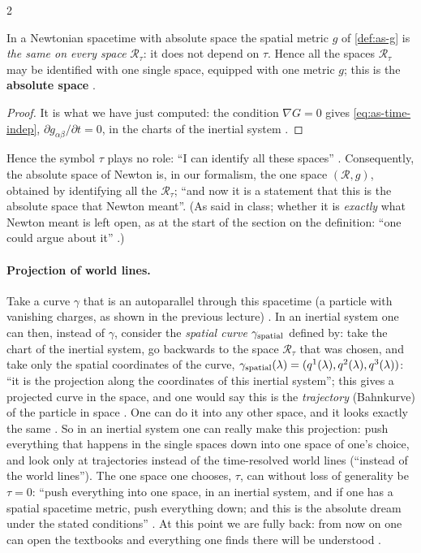 \begin{paracol}{2}
\begin{theorem}\label{thm:as-absolute}
In a Newtonian spacetime with absolute space the spatial metric $g$ of \cref{def:as-g} is \emph{the same on every space} $\mathcal R_\tau$: it does not depend on $\tau$. Hence all the spaces $\mathcal R_\tau$ may be identified with one single space, equipped with one metric $g$; this is the
\textbf{absolute space} .
\end{theorem}
\begin{proof}
It is what we have just computed: the condition $\nabla G=0$ gives \eqref{eq:as-time-indep}, $\partial g_{\alpha\beta}/\partial t=0$, in the charts of the inertial system . \qedhere
\end{proof}
Hence the symbol $\tau$ plays no role: ``I can identify all these spaces'' . Consequently, the absolute space of Newton is, in our formalism, the one space $(\mathcal R,g)$, obtained by identifying all the $\mathcal R_\tau$; ``and now it is a statement
that this is the absolute space that Newton meant''. (As said in class; whether it is \emph{exactly} what Newton meant is left open, as at the start of the section on the definition: ``one could argue about it'' .)

\paragraph{Projection of world lines.} Take a curve $\gamma$ that is an autoparallel through this spacetime (a particle with vanishing charges, as shown in the previous lecture) . In an inertial system one can then, instead of $\gamma$, consider the \emph{spatial curve}
$\gamma_{\rm spatial}$ defined by: take the chart of the inertial system, go backwards to the space $\mathcal R_\tau$ that was chosen, and take only the spatial coordinates of the curve, $\gamma_{\rm spatial}(\lambda)=(q^1(\lambda),q^2(\lambda),q^3(\lambda))$: ``it is the projection along the coordinates of this inertial system'';
this gives a projected curve in the space, and one would say this is the \emph{trajectory} (Bahnkurve) of the particle in space . One can do it into any other space, and it looks exactly the same . So in an inertial system one can really make this projection: push everything that happens in the single spaces down into one
space of one's choice, and look only at trajectories instead of the time-resolved world lines (``instead of the world lines''). The one space one chooses, $\tau$, can without loss of generality be $\tau=0$: ``push everything into one space, in an inertial system, and if one has a spatial spacetime metric, push everything down; and this is the
absolute dream under the stated conditions'' .
At this point we are fully back: from now on one can open the textbooks and everything one finds there will be understood .


\end{paracol}
